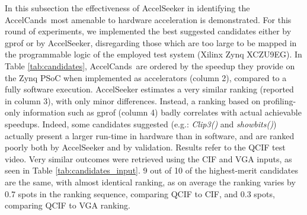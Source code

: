 \documentclass[]{usiinfthesis}
\newcommand{\aseeker}{{AccelSeeker}}
\newcommand{\candidates}{{AccelCand}s}
\begin{document}
In this subsection the effectiveness of \aseeker{} in identifying
the \candidates\ most amenable to hardware acceleration is demonstrated. 
For this round of experiments, we implemented the best suggested candidates
either by gprof or by \aseeker{}, disregarding those which are too
large to be mapped in the programmable logic of the employed test
system (Xilinx Zynq XCZU9EG).  In Table \ref{tab:candidates},
\candidates\ are ordered by the speedup they provide on the Zynq PSoC 
when implemented as accelerators  (column 2), compared to a
fully software execution.  \aseeker{} estimates a very similar ranking
(reported in column 3), with only minor differences. Instead, a
ranking based on profiling-only information such as gprof (column 4)
badly correlates with actual achievable speedups.
Indeed, some candidates suggested (e.g.: \emph{Clip3()} and
\emph{showbits()}) actually present a larger run-time in hardware than
in software, and are ranked poorly both by \aseeker{} and by
validation.
Results refer to the QCIF test video. Very similar outcomes were retrieved 
using the CIF and VGA inputs, as seen in Table \ref{tab:candidates_input}. 
9 out of 10 of the highest-merit candidates are the same, with almost identical ranking,
as on average the ranking varies by 0.7 spots in the ranking sequence, comparing QCIF 
to CIF, and 0.3 spots, comparing QCIF to VGA ranking.
\end{document}
